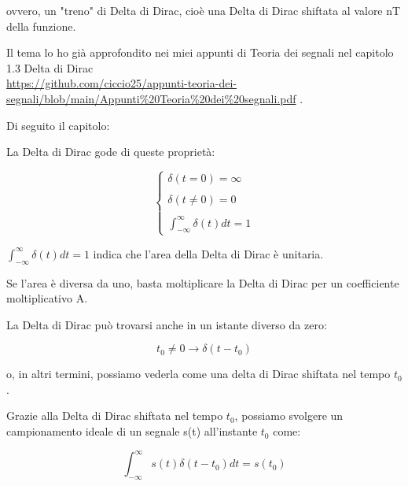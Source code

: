 ovvero, un "treno" di Delta di Dirac, cioè una Delta di Dirac shiftata al valore nT della funzione. \newline 

\begin{tcolorbox}
    Il tema lo ho già approfondito nei miei appunti di Teoria dei segnali nel capitolo 
    1.3 Delta di Dirac \\\url{https://github.com/ciccio25/appunti-teoria-dei-segnali/blob/main/Appunti%20Teoria%20dei%20segnali.pdf} .\newline 

    Di seguito il capitolo: \newline

La Delta di Dirac gode di queste proprietà: 

{
    \Large 
    \begin{equation}
        \begin{cases}
            \delta (t = 0) = \infty \\ \\
            \delta (t \not = 0) = 0 \\ \\
            \int_{- \infty}^{ \infty} \delta (t) dt = 1
        \end{cases}
    \end{equation}
}

$\int_{- \infty}^{ \infty} \delta (t) dt = 1$ indica che l'area della Delta di Dirac è unitaria. \newline 

Se l'area è diversa da uno, basta moltiplicare la Delta di Dirac per un coefficiente moltiplicativo A. \newline 

La Delta di Dirac può trovarsi anche in un istante diverso da zero: 

{
    \Large 
    \begin{equation}
        t_0 \not = 0 
        \rightarrow 
        \delta (t - t_0)
     \end{equation}
}

o, in altri termini, possiamo vederla come una delta di Dirac shiftata nel tempo $t_0$. \newline 

Grazie alla Delta di Dirac shiftata nel tempo $t_0$, possiamo svolgere un campionamento ideale di un segnale s(t) all'instante $t_0$ come: 

{
    \Large 
    \begin{equation}
        \int_{- \infty}^{\infty} 
        s(t) \delta (t - t_0) dt 
        = 
        s(t_0)
    \end{equation}
}

\end{tcolorbox}

